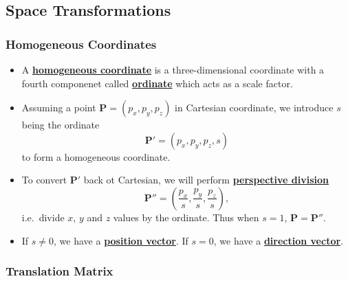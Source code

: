 \documentclass[twocolumn,landscape,10pt]{article}
\theoremstyle{definition}
\begin{document}
\subsection{Space Transformations}

\subsubsection{Homogeneous Coordinates}

\begin{itemize}
    \item A \underline{\textbf{homogeneous coordinate}} is a three-dimensional
        coordinate with a fourth componenet called
        \underline{\textbf{ordinate}} which acts as a scale factor.
    \item Assuming a point $\mathbf{P}=(p_x,p_y,p_z)$ 
        in Cartesian coordinate, we introduce $s$ being the ordinate
        \[
            \mathbf{P}'=(p_x, p_y, p_z, s)
        \]
        to form a homogeneous coordinate.
    \item To convert $\mathbf{P}'$ back ot Cartesian, we will perform
        \underline{\textbf{perspective division}}
        \[
            \mathbf{P}''=\left(\frac{p_x}{s},\frac{p_y}{s},\frac{p_z}{s}\right),
        \]
        i.e.\ divide $x$, $y$ and $z$ values by the ordinate.
        Thus when $s=1$, $\mathbf{P}=\mathbf{P}''$.
    \item If $s\neq 0$, we have a \underline{\textbf{position vector}}.
        If $s=0$, we have a \underline{\textbf{direction vector}}.
\end{itemize} 

\subsubsection{Translation Matrix}
\end{document}
